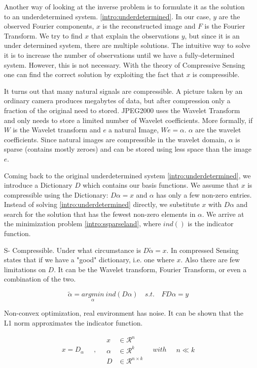 Another way of looking at the inverse problem is to formulate it as the solution to an underdetermined system. \eqref{intro:underdetermined}. In our case, $y$ are the observed Fourier components, $x$ is the reconstructed image and $F$ is the Fourier Transform. We try to find $x$ that explain the observations $y$, but since it is an under determined system, there are multiple solutions. The intuitive way to solve it is to increase the number of observations until we have a fully-determined system. However, this is not necessary. With the theory of Compressive Sensing one can find the correct solution by exploiting the fact that $x$ is compressible.

It turns out that many natural signals are compressible. A picture taken by an ordinary camera produces megabytes of data, but after compression only a fraction of the original need to stored. JPEG2000 uses the Wavelet Transform and only needs to store a limited number of Wavelet coefficients. More formally, if $W$ is the Wavelet transform and $e$ a natural Image, $We = \alpha$. $\alpha$ are the wavelet coefficients. Since natural images are compressible in the wavelet domain, $\alpha$ is sparse (contains mostly zeroes) and can be stored using less space than the image $e$.

Coming back to the original underdetermined system \eqref{intro:underdetermined}, we introduce a Dictionary $D$ which contains our basis functions. We assume that $x$ is compressible using the Dictionary: $D\alpha = x$ and $\alpha$ has only a few non-zero entries. Instead of solving \eqref{intro:underdetermined} directly, we substitute $x$ with $D\alpha$ and search for the solution that has the fewest non-zero elements in $\alpha$. We arrive at the minimization problem \eqref{intro:ssparseland}, where $\mathit{ind}()$ is the indicator function. 

S- Compressible. Under what circumstance is $D\tilde{\alpha} = x$. In compressed Sensing states that if we have a "good" dictionary, i.e. one where $x$. Also there are few limitations on $D$. It can be the Wavelet transform, Fourier Transform, or even a combination of the two.

\begin{equation}\label{intro:ssparseland}
\tilde{\alpha} =  \underset{\alpha}{arg min} \: \mathit{ind}(D\alpha) \quad s. t. \quad FD\alpha = y
\end{equation}

Non-convex optimization, real environment has noise. It can be shown that the L1 norm approximates the indicator function.

\begin{equation}\label{intro:sparseland}
\begin{split}
x  =  D_{\alpha}
\end{split}
\quad , \quad
\begin{split}
x &\in \mathcal{R}^n\\
\alpha &\in \mathcal{R}^k\\
D &\in \mathcal{R}^{n \times k}
\end{split}
\quad with \quad
\begin{split}
n \ll k
\end{split}
\end{equation}


